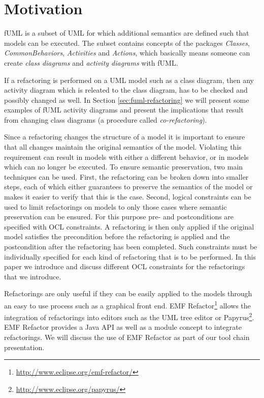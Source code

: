 \documentclass{llncs}
\begin{document}
\section{Motivation}
\label{sec:motivation}
fUML is a subset of UML for which additional semantics are defined such that models can be executed. The subset contains concepts
of the packages \textit{Classes}, 
\textit{CommonBehaviors}, \textit{Activities} and \textit{Actions}, which basically means someone can create 
\textit{class diagrams} and \textit{activity diagrams} with fUML.

If a refactoring 
is performed on a UML model such as a class diagram, then any activity diagram which is releated to the class diagram, has 
to be checked and possibly changed as well. In Section \ref{sec:fuml-refactoring} we will present some examples of fUML 
activity diagrams and present the implications that result from changing class 
diagrams (a procedure called \textit{co-refactoring}).

Since a refactoring changes the structure of a model it is important to ensure that all changes maintain the original 
semantics of the model. Violating this requirement can result in models with either a different behavior, or in models 
which can no longer be executed. To ensure semantic preservation, two main techniques can be used. First, the refactoring 
can be broken down into smaller steps, each of which either guarantees to preserve the semantics of the model or makes it 
easier to verify that this is the case. Second, logical constraints can be used to limit refactorings on models to only 
those cases where semantic preservation can be ensured. For this purpose pre- and postconditions are specified with OCL 
constraints. A refactoring is then only applied if the original model satisfies the precondition before the refactoring is 
applied and the postcondition after the refactoring has been completed. Such constraints must be individually specified 
for each kind of refactoring that is to be performed. In this paper we introduce and discuss different OCL constraints 
for the refactorings that we introduce.

Refactorings are only useful if they can be easily applied to the models through an easy to use process such as a 
graphical front end. EMF Refactor\footnote{\url{http://www.eclipse.org/emf-refactor/}} allows the integration of 
refactorings into editors such as the UML tree editor or 
Papyrus\footnote{\url{http://www.eclipse.org/papyrus/}}. EMF Refactor provides a Java API as well as a module 
concept to integrate refactorings. We will discuss the use 
of EMF Refactor as part of our tool chain presentation.
\end{document}
